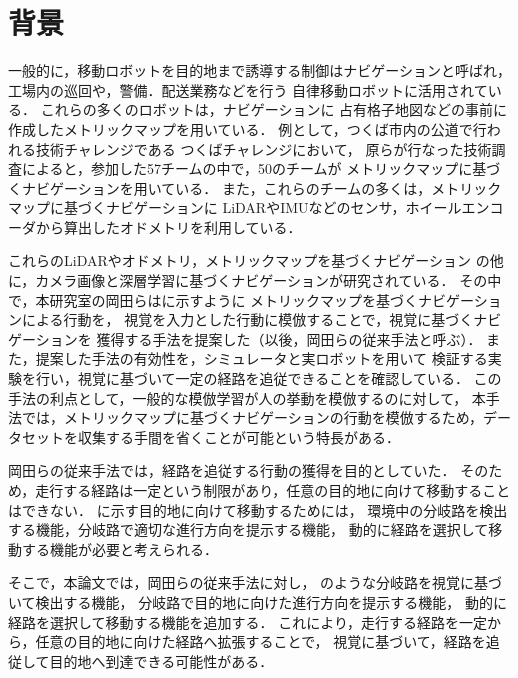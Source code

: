
\section{背景}
一般的に，移動ロボットを目的地まで誘導する制御はナビゲーションと呼ばれ，工場内の巡回や，警備．配送業務などを行う
自律移動ロボットに活用されている．
これらの多くのロボットは，ナビゲーションに
占有格子地図などの事前に作成したメトリックマップを用いている．
例として，つくば市内の公道で行われる技術チャレンジである
つくばチャレンジにおいて，
原らが行なった技術調査\cite{hara2019}によると，参加した57チームの中で，50のチームが
メトリックマップに基づくナビゲーションを用いている．
また，これらのチームの多くは，メトリックマップに基づくナビゲーションに
LiDARやIMUなどのセンサ，ホイールエンコーダから算出したオドメトリを利用している．

これらのLiDARやオドメトリ，メトリックマップを基づくナビゲーション
の他に，カメラ画像と深層学習に基づくナビゲーションが研究\cite{kendall2018learning}\cite{sauer2018conditional}されている．
その中で，本研究室の岡田ら\cite{okada2020}\cite{okada2021}はに示すように
メトリックマップを基づくナビゲーションによる行動を，
視覚を入力とした行動に模倣することで，視覚に基づくナビゲーションを
獲得する手法を提案した（以後，岡田らの従来手法と呼ぶ）．
また，提案した手法の有効性を，シミュレータと実ロボットを用いて
検証する実験を行い，視覚に基づいて一定の経路を追従できることを確認している．
この手法の利点として，一般的な模倣学習が人の挙動を模倣するのに対して，
本手法では，メトリックマップに基づくナビゲーションの行動を模倣するため，データセットを収集する手間を省くことが可能という特長がある．

岡田らの従来手法では，経路を追従する行動の獲得を目的としていた．
そのため，走行する経路は一定という制限があり，任意の目的地に向けて移動することはできない．
に示す目的地に向けて移動するためには，
環境中の分岐路を検出する機能，分岐路で適切な進行方向を提示する機能，
動的に経路を選択して移動する機能が必要と考えられる．

そこで，本論文では，岡田らの従来手法に対し，
のような分岐路を視覚に基づいて検出する機能，
分岐路で目的地に向けた進行方向を提示する機能，
動的に経路を選択して移動する機能を追加する．
これにより，走行する経路を一定から，任意の目的地に向けた経路へ拡張することで，
視覚に基づいて，経路を追従して目的地へ到達できる可能性がある．

